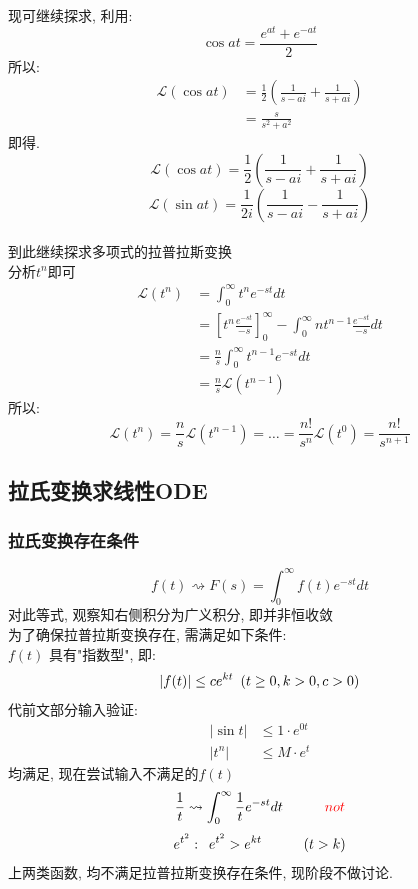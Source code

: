 现可继续探求, 利用:
\[ \cos at = \frac{e^{at} + e^{-at}}{2} \]
所以:
\begin{align*}
   \mathcal{L} (\cos at) &= \frac{1}{2} (\frac{1}{s-ai} + \frac{1}{s+ai}) \\
   &= \frac{s}{s^2 + a^2}
\end{align*}
\hfill 即得.
\[ \mathcal{L} (\cos at) = \frac{1}{2} (\frac{1}{s-ai} + \frac{1}{s+ai}) \]
\[ \mathcal{L} (\sin at) = \frac{1}{2i} (\frac{1}{s-ai} - \frac{1}{s+ai}) \]\\[1em]
到此继续探求多项式的拉普拉斯变换\\
分析$t^n$即可
\begin{align*}
   \mathcal{L} (t^n) &= \int_{0}^{\infty} t^n e^{-st} dt  \\
   &= \left[t^n \frac{e^{-st}}{-s}\right]_{0}^{\infty} - \int_{0}^{\infty} n t^{n-1} \frac{e^{-st}}{-s} dt\\
   &= \frac{n}{s} \int_{0}^{\infty} t^{n-1} e^{-st} dt \\
   &= \frac{n}{s} \mathcal{L} (t^{n-1})
\end{align*}
所以:
\[ \mathcal{L}(t^n) = \frac{n}{s} \mathcal{L}(t^{n-1}) = \dots = \frac{n!}{s^n} \mathcal{L}(t^0) = \frac{n!}{s^{n+1}} \]

\subsection{\LARGE \hspace*{0.1em}拉氏变换求线性ODE}
\subsubsection{\large 拉氏变换存在条件}
\[ f(t) \rightsquigarrow F(s) = \int_0^\infty f(t) e^{-st} dt \]
对此等式, 观察知右侧积分为广义积分, 即并非恒收敛\\
为了确保拉普拉斯变换存在, 需满足如下条件:\\
$f(t)$ 具有"指数型", 即:
\[ \left\lvert f(t)\right\rvert \leq c e^{k t} \hspace*{0.5em} (t \geq 0 , k > 0 , c > 0) \]
代前文部分输入验证:
\begin{align*}
   \left\lvert \sin t \right\rvert &\leq 1 \cdot  e^{0 t} \\
   \left\lvert  t^n \right\rvert &\leq M \cdot  e^{t} 
\end{align*}
均满足, 现在尝试输入不满足的$f(t)$
\[ \frac{1}{t} \rightsquigarrow \int_{0}^{\infty} \frac{1}{t} e^{-st} dt  \hspace*{3em} \textcolor{red}{not} \]
\[ e^{t^2}: \hspace*{0.5em}  e^{t^2} > e^{kt} \hspace*{3em} (t > k) \]
上两类函数, 均不满足拉普拉斯变换存在条件, 现阶段不做讨论.

